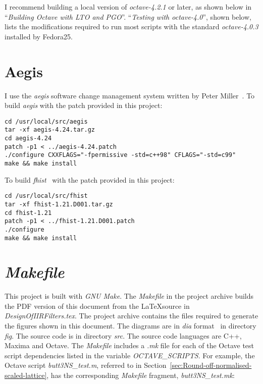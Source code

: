 \documentclass[a4paper,twoside,10pt,english]{report}
\begin{document}
I recommend building a local version of \emph{octave-4.2.1} or later, as shown
below in ``\emph{Building Octave with LTO and PGO}''. ``\emph{Testing with
 octave-4.0}'', shown below, lists the modifications required to run most
scripts with the standard \emph{octave-4.0.3} installed by Fedora25.

\section*{Aegis}
I use the \emph{aegis} software change management system written by
Peter Miller~\cite{Miller_Wikipedia,Miller_aegis}. To build \emph{aegis} with
the patch provided in this project:
\begin{small}
\begin{verbatim} 
cd /usr/local/src/aegis
tar -xf aegis-4.24.tar.gz
cd aegis-4.24
patch -p1 < ../aegis-4.24.patch
./configure CXXFLAGS="-fpermissive -std=c++98" CFLAGS="-std=c99"
make && make install
\end{verbatim}
\end{small}
To build \emph{fhist}~\cite{Miller_fhist} with the patch provided in this 
project:
\begin{small}
\begin{verbatim} 
cd /usr/local/src/fhist
tar -xf fhist-1.21.D001.tar.gz
cd fhist-1.21
patch -p1 < ../fhist-1.21.D001.patch
./configure 
make && make install
\end{verbatim}
\end{small}
\section*{\emph{Makefile}}
This project is built with \emph{GNU Make}. The \emph{Makefile} in the project
archive builds the PDF version of this document from the \LaTeX source in
\emph{DesignOfIIRFilters.tex}. The project archive contains the files required
to generate the figures shown in this document. The diagrams are in \emph{dia}
format~\cite{Dia_DiagramEditor} in directory \emph{fig}.  The source code is
in directory \emph{src}.  The source code languages are C++, Maxima and
Octave. The \emph{Makefile} includes a \emph{.mk} file for each of the Octave
test script dependencies listed in the variable \emph{OCTAVE\_SCRIPTS}. For
example, the Octave script \emph{butt3NS\_test.m}, referred to in
Section~\ref{sec:Round-off-normalised-scaled-lattice}, has the corresponding
\emph{Makefile} fragment, \emph{butt3NS\_test.mk}:
\begin{small}

\end{small}
\end{document}
